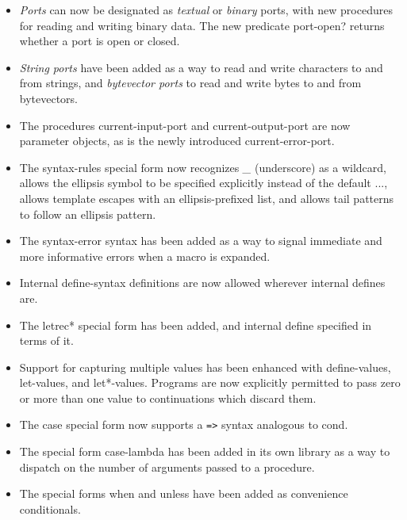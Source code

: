\begin{itemize}
\item {\em Ports} can now be designated as {\em textual} or {\em
binary} ports, with new procedures for reading and writing binary
data.
The new predicate {\cf port-open?} returns whether a port is open or closed.

\item {\em String ports} have been added as a way to read and write
characters to and from strings, and {\em bytevector ports} to read
and write bytes to and from bytevectors.

\item The procedures {\cf current-input-port} and {\cf current-output-port} are now
parameter objects, as is the newly introduced {\cf
current-error-port}.

\item The {\cf syntax-rules} special form now recognizes {\em \_} (underscore) as a wildcard, allows
the ellipsis symbol to be specified explicitly instead of the default
{\cf ...}, allows template escapes with an ellipsis-prefixed list, and
allows tail patterns to follow an ellipsis pattern.

\item The {\cf syntax-error} syntax has been added as a way to signal immediate
and more informative errors when a macro is expanded.

\item Internal {\cf define-syntax} definitions are now allowed wherever
internal {\cf define}s are.

\item The {\cf letrec*} special form has been added, and internal {\cf define} specified in
terms of it.

\item Support for capturing multiple values has been enhanced with {\cf
define-values}, {\cf let-values}, and {\cf let*-values}.
Programs are now explicitly permitted to pass zero or more than one
value to continuations which discard them.

\item The {\cf case} special form now supports a {\tt =>} syntax analogous to {\cf cond}.

\item The special form {\cf case-lambda} has been added in its own library as a way to
dispatch on the number of arguments passed to a procedure.

\item The special forms {\cf when} and {\cf unless} have been added as convenience
conditionals.


\end{itemize}
